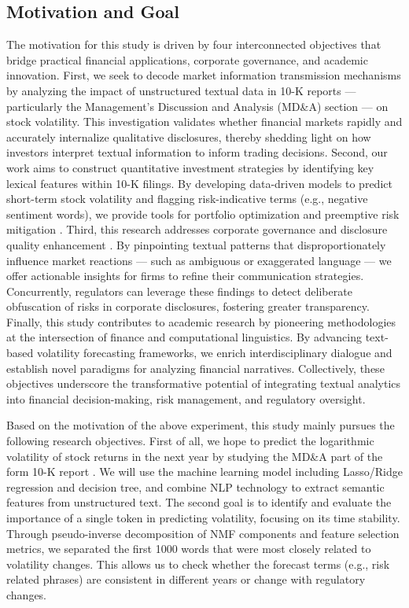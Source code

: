 \documentclass[11pt]{article}
\begin{document}
\subsection{Motivation and Goal}

The motivation for this study is driven by four interconnected objectives that bridge practical financial applications, corporate governance, and academic innovation. First, we seek to decode market information transmission mechanisms by analyzing the impact of unstructured textual data in 10-K reports --- particularly the Management's Discussion and Analysis (MD\&A) section \cite{brown2024financial}  --- on stock volatility. This investigation validates whether financial markets rapidly and accurately internalize qualitative disclosures, thereby shedding light on how investors interpret textual information to inform trading decisions. Second, our work aims to construct quantitative investment strategies by identifying key lexical features within 10-K filings. By developing data-driven models to predict short-term stock volatility and flagging risk-indicative terms (e.g., negative sentiment words), we provide tools for portfolio optimization and preemptive risk mitigation \cite{ta2020portfolio} . Third, this research addresses corporate governance and disclosure quality enhancement \cite{RAJENDRAN2024101813} . By pinpointing textual patterns that disproportionately influence market reactions --- such as ambiguous or exaggerated language --- we offer actionable insights for firms to refine their communication strategies. Concurrently, regulators can leverage these findings to detect deliberate obfuscation of risks in corporate disclosures, fostering greater transparency. Finally, this study contributes to academic research by pioneering methodologies at the intersection of finance and computational linguistics. By advancing text-based volatility forecasting frameworks, we enrich interdisciplinary dialogue and establish novel paradigms for analyzing financial narratives. Collectively, these objectives underscore the transformative potential of integrating textual analytics into financial decision-making, risk management, and regulatory oversight.

Based on the motivation of the above experiment, this study mainly pursues the following research objectives. First of all, we hope to predict the logarithmic volatility of stock returns in the next year by studying the MD\&A part of the form 10-K report \cite{MATTERA20241539}\cite{ma2023stock} . We will use the machine learning model including Lasso/Ridge regression and decision tree, and combine NLP technology \cite{yogatama2015sparse} to extract semantic features from unstructured text. The second goal is to identify and evaluate the importance of a single token in predicting volatility, focusing on its time stability. Through pseudo-inverse decomposition of NMF components \cite{fu2019nonnegative} and feature selection metrics, we separated the first 1000 words that were most closely related to volatility changes. This allows us to check whether the forecast terms (e.g., risk related phrases) are consistent in different years or change with regulatory changes.
\end{document}
